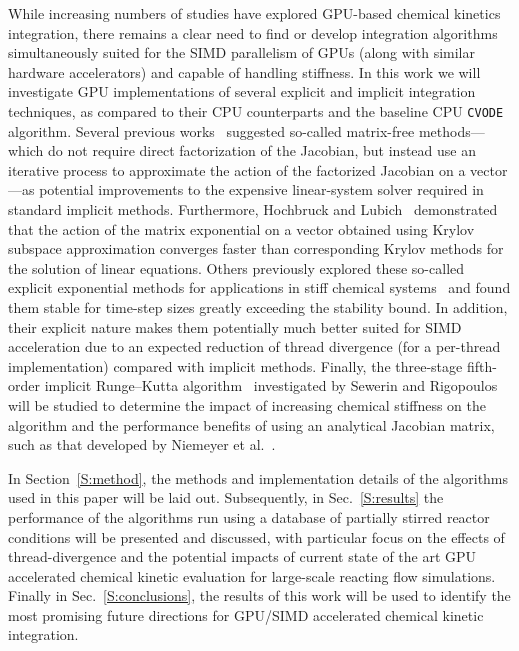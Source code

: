 \documentclass[final,twocolumn]{elsarticle}
\begin{document}
While increasing numbers of studies have explored GPU-based chemical kinetics integration, there remains a clear need to find or develop integration algorithms simultaneously suited for the SIMD parallelism of GPUs (along with similar hardware accelerators) and capable of handling stiffness.
In this work we will investigate GPU implementations of several explicit and implicit integration techniques, as compared to their CPU counterparts and the baseline CPU \texttt{CVODE}~\cite{Hindmarsh:2005hg} algorithm.
Several previous works~\cite{Perini20141180,McNenly2015581} suggested so-called matrix-free methods---which do not require direct factorization of the Jacobian, but instead use an iterative process to approximate the action of the factorized Jacobian on a vector---as potential improvements to the expensive linear-system solver required in standard implicit methods.
Furthermore, Hochbruck and Lubich~\cite{Hochbruck:1997} demonstrated that the action of the matrix exponential on a vector obtained using Krylov subspace approximation converges faster than corresponding Krylov methods for the solution of linear equations.
Others previously explored these so-called explicit exponential methods for applications in stiff chemical systems~\cite{Bisetti:2012jw,falati2011integration} and found them stable for time-step sizes greatly exceeding the stability bound.
In addition, their explicit nature makes them potentially much better suited for SIMD acceleration due to an expected reduction of thread divergence (for a per-thread implementation) compared with implicit methods.
Finally, the three-stage fifth-order implicit Runge--Kutta algorithm~\cite{wanner1991solving} investigated by Sewerin and Rigopoulos~\cite{Sewerin20151375} will be studied to determine the impact of increasing chemical stiffness on the algorithm and the performance benefits of using an analytical Jacobian matrix, such as that developed by Niemeyer et al.~\cite{Niemeyer:2015im,Niemeyer:2015ws}.

In Section~\ref{S:method}, the methods and implementation details of the algorithms used in this paper will be laid out.
Subsequently, in Sec.~\ref{S:results} the performance of the algorithms run using a database of partially stirred reactor conditions will be presented and discussed, with particular focus on the effects of thread-divergence and the potential impacts of current state of the art GPU accelerated chemical kinetic evaluation for large-scale reacting flow simulations.
Finally in Sec.~\ref{S:conclusions}, the results of this work will be used to identify the most promising future directions for GPU\slash SIMD accelerated chemical kinetic integration.
\end{document}

